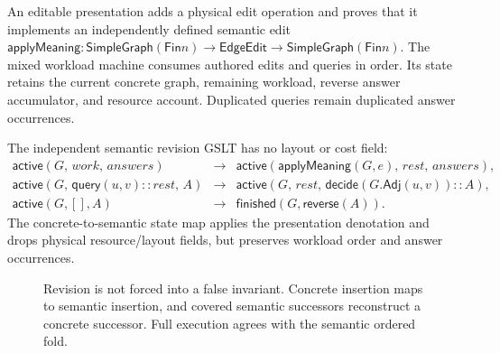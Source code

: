 \documentclass[11pt]{article}
\theoremstyle{remark}
\newcommand{\SG}{\mathsf{SimpleGraph}}
\newcommand{\Step}{\mathrel{\longrightarrow}}
\newcommand{\Fin}{\mathsf{Fin}}
\begin{document}
An editable presentation adds a physical edit operation and proves that it
implements an independently defined semantic edit
\(\mathsf{applyMeaning}:\SG(\Fin n)\to\mathsf{EdgeEdit}\to\SG(\Fin n)\).
The mixed workload machine consumes authored edits and queries in order.  Its
state retains the current concrete graph, remaining workload, reverse answer
accumulator, and resource account.  Duplicated queries remain duplicated
answer occurrences.

The independent semantic revision GSLT has no layout or cost field:
\[
\begin{array}{lcl}
\mathsf{active}(G,\,\mathit{work},\,\mathit{answers})
  &\Step&
\mathsf{active}(\mathsf{applyMeaning}(G,e),\,\mathit{rest},\,
  \mathit{answers}),\\[1mm]
\mathsf{active}(G,\,\mathsf{query}(u,v)::\mathit{rest},\,A)
  &\Step&
\mathsf{active}(G,\,\mathit{rest},\,
  \mathsf{decide}(G.\mathsf{Adj}(u,v))::A),\\[1mm]
\mathsf{active}(G,[],A)&\Step&\mathsf{finished}(G,\mathsf{reverse}(A)).
\end{array}
\]
The concrete-to-semantic state map applies the presentation denotation and
drops physical resource/layout fields, but preserves workload order and answer
occurrences.

\begin{figure}[htbp]
\centering
{}
\caption{Revision is not forced into a false invariant.  Concrete insertion
maps to semantic insertion, and covered semantic successors reconstruct a
concrete successor.  Full execution agrees with the semantic ordered fold.}
\label{fig:revision-square}
\end{figure}
\end{document}
